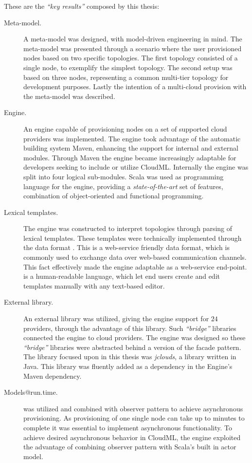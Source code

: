 These are the \emph{``key results''} composed by this thesis:
\begin{description}
  \item[Meta-model.]
    A meta-model was designed, with model-driven engineering in mind.
    The meta-model was presented through a scenario where the user
    provisioned nodes based on two specific topologies.
    The first topology consisted of a single node, to exemplify the simplest topology.
    The second setup was based on three nodes, representing a common multi-tier
    topology for development purposes.
    Lastly the intention of a multi-cloud provision with the meta-model was described.
  \item[Engine.]
    An engine capable of provisioning nodes on a set of supported cloud providers
    was implemented.
    The engine took advantage of the automatic building system Maven,
    enhancing the support for internal and external modules.
    Through Maven the engine became increasingly adaptable for developers
    seeking to include or utilize CloudML.
    Internally the engine was split into four logical sub-modules.
    Scala was used as programming language for the engine,
    providing a \emph{state-of-the-art} set of features,
    \eg combination of object-oriented and functional programming.
  \item[Lexical templates.]
    The engine was constructed to interpret topologies through parsing of lexical templates.
    These templates were technically implemented through the data format .
    This is a web-service friendly data format, which is commonly used to exchange data
    over web-based communication channels.
    This fact effectively made the engine adaptable as a web-service end-point.
     is a human-readable language, which let end users create and edit
    templates manually with any text-based editor.
  \item[External library.]
    An external library was utilized, giving the engine support for $24$ providers,
    through the advantage of this library.
    Such \emph{``bridge''} libraries connected the engine to cloud providers.
    The engine was designed so these \emph{``bridge''} libraries were abstracted
    behind a version of the facade pattern.
    The library focused upon in this thesis was \emph{jclouds},
    a library written in Java.
    This library was fluently added as a dependency in the Engine's Maven dependency.
  \item[Models@run.time.]
     was utilized and combined with observer pattern to
    achieve asynchronous provisioning.
    As provisioning of one single node can take up to minutes to complete it was
    essential to implement asynchronous functionality.
    To achieve desired asynchronous behavior in CloudML,
    the engine exploited the advantage of combining observer pattern with Scala's
    built in actor model.
\end{description}
